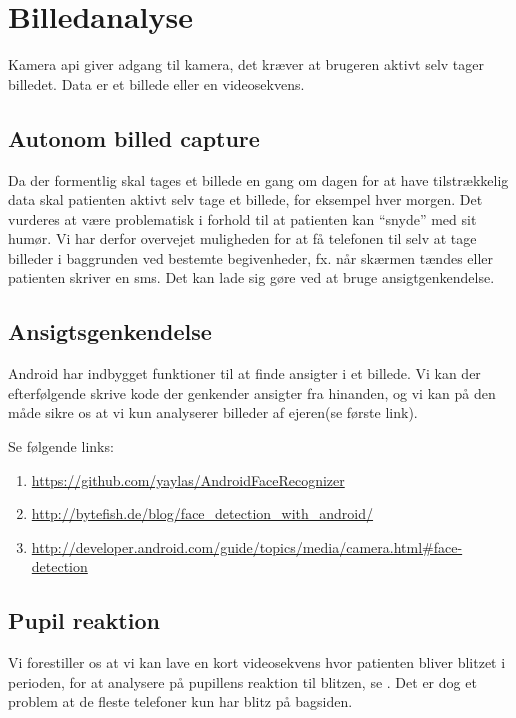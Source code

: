 \section{Billedanalyse}
Kamera api giver adgang til kamera, det kræver at brugeren aktivt selv tager billedet. Data er et billede eller en videosekvens.

\subsection{Autonom billed capture}
Da der formentlig skal tages et billede en gang om dagen for at have tilstrækkelig data skal patienten aktivt selv tage et billede, for eksempel hver morgen.
Det vurderes at være problematisk i forhold til at patienten kan ``snyde'' med sit humør.
Vi har derfor overvejet muligheden for at få telefonen til selv at tage billeder i baggrunden ved bestemte begivenheder, fx. når skærmen tændes eller patienten skriver en sms.
Det kan lade sig gøre ved at bruge ansigtgenkendelse.

\subsection{Ansigtsgenkendelse}
Android har indbygget funktioner til at finde ansigter i et billede. 
Vi kan der efterfølgende skrive kode der genkender ansigter fra hinanden, og vi kan på den måde sikre os at vi kun analyserer billeder af ejeren(se første link).

Se følgende links:
\begin{enumerate}
\item \url{https://github.com/yaylas/AndroidFaceRecognizer}

\item \url{http://bytefish.de/blog/face\_detection\_with\_android/}

\item \url{http://developer.android.com/guide/topics/media/camera.html#face-detection}
	
\end{enumerate}

\subsection{Pupil reaktion}
Vi forestiller os at vi kan lave en kort videosekvens hvor patienten bliver blitzet i perioden, for at analysere på pupillens reaktion til blitzen, se \cite{hoeks1993pupillary}.
Det er dog et problem at de fleste telefoner kun har blitz på bagsiden.

